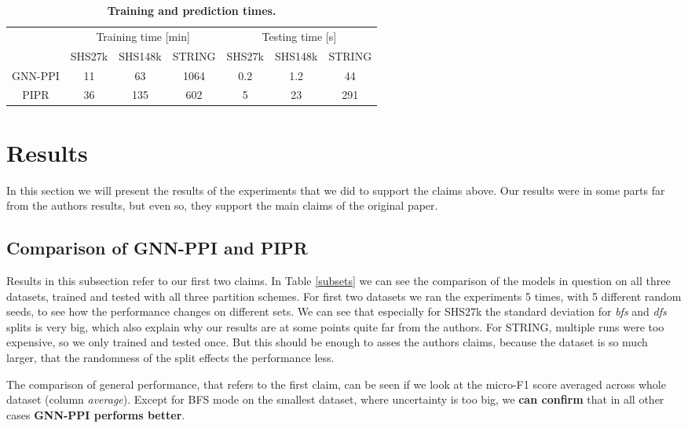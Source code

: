 \begin{table}[h] \caption{\label{times}\textbf{Training and prediction times.}}\centering
\begin{tabular}{ccccccc} 
    \toprule
    \multirow{2}{*}[-3pt]{} & \multicolumn{3}{c}{Training time [min]} & \multicolumn{3}{c}{Testing time [s]} \\ 
        \cmidrule(l{5pt}r{5pt}){2-4} \cmidrule(l{5pt}r{5pt}){5-7} 
      & SHS27k & SHS148k & STRING  & SHS27k & SHS148k & STRING \\ 
         \midrule
    GNN-PPI & 11 & 63 & 1064 & 0.2 & 1.2 & 44 \\ 

    PIPR & 36 & 135 & 602 & 5 & 23 & 291 \\ 
    \bottomrule
\end{tabular}
\end{table}

\section{Results}
\label{sec:results}
In this section we will present the results of the experiments that we did to support the claims above. Our results were in some parts far from the authors results, but even so, they support the main claims of the original paper.

\subsection{Comparison of GNN-PPI and PIPR}
Results in this subsection refer to our first two claims. In Table \ref{subsets} we can see the comparison of the models in question on all three datasets, trained and tested with all three partition schemes.
For first two datasets we ran the experiments 5 times, with 5 different random seeds, to see how the performance changes on different sets. We can see that especially for SHS27k the standard deviation for \emph{bfs} and \emph{dfs} splits is very big, which also explain why our results are at some points quite far from the authors. For STRING, multiple runs were too expensive, so we only trained and tested once. But this should be enough to asses the authors claims, because the dataset is so much larger, that the randomness of the split effects the performance less.

The comparison of general performance, that refers to the first claim, can be seen if we look at the micro-F1 score averaged across whole dataset (column \emph{average}). Except for BFS mode on the smallest dataset, where uncertainty is too big, we \textbf{can confirm} that in all other cases \textbf{GNN-PPI performs better}.

